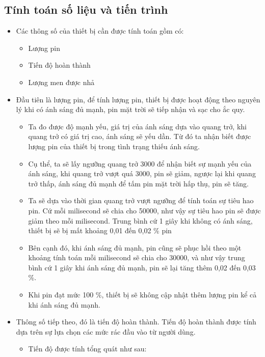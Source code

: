 \documentclass[12pt, a4paper]{article}
\begin{document}
\subsection{Tính toán số liệu và tiến trình}
\begin{itemize}
    \item Các thông số của thiết bị cần được tính toán gồm có:
    \begin{itemize}
        \item Lượng pin
        \item Tiến độ hoàn thành
        \item Lượng men được nhả
    \end{itemize}
    \item Đầu tiên là lượng pin, để tính lượng pin, thiết bị được hoạt động theo nguyên lý khi có ánh sáng đủ mạnh, pin mặt trời sẽ tiếp nhận và sạc cho ắc quy. 
    \begin{itemize}
        \item Ta đo được độ mạnh yếu, giá trị của ánh sáng dựa vào quang trở, khi quang trở có giá trị cao, ánh sáng sẽ yếu dần. Từ đó ta nhận biết được lượng pin của thiết bị trong tình trạng thiếu ánh sáng.
        \item Cụ thể, ta sẽ lấy ngưỡng quang trở 3000 để nhận biết sự mạnh yếu của ánh sáng, khi quang trở vượt quá 3000, pin sẽ giảm, ngược lại khi quang trở thấp, ánh sáng đủ mạnh để tấm pin mặt trời hấp thụ, pin sẽ tăng.
        \item Ta sẽ dựa vào thời gian quang trở vượt ngưỡng để tính toán sự tiêu hao pin. Cứ mỗi milisecond sẽ chia cho 50000, như vậy sự tiêu hao pin sẽ được giảm theo mỗi milisecond. Trung bình cứ 1 giây khi không có ánh sáng, thiết bị sẽ bị mất khoảng 0,01 đến 0,02 \% pin
        \item Bên cạnh đó, khi ánh sáng đủ mạnh, pin cũng sẽ phục hồi theo một khoảng tính toán mỗi milisecond sẽ chia cho 30000, và như vậy trung bình cứ 1 giây khi ánh sáng đủ mạnh, pin sẽ lại tăng thêm 0,02 đến 0,03 \%.
        \item Khi pin đạt mức 100 \%, thiết bị sẽ không cập nhật thêm lượng pin kể cả khi ánh sáng đủ mạnh.
    \end{itemize}
    \item Thông số tiếp theo, đó là tiến độ hoàn thành. Tiến độ hoàn thành được tính dựa trên sự lựa chọn các mức rác đầu vào từ người dùng.
    \begin{itemize}
        \item Tiến độ được tính tổng quát như sau: \\

\end{itemize}
\end{itemize}
\end{document}
